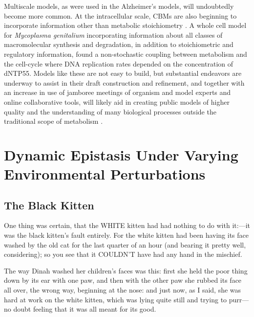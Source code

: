 \documentclass[phd,tocprelim,draft]{cornell}
\newcommand{\citep}[1]{\cite{#1}}
\begin{document}
Multiscale models, as were used in the Alzheimer’s models, will
undoubtedly become more common. At the intracellular scale, CBMs are
also beginning to incorporate information other than metabolic
stoichiometry \citep{Lerman2012, Karr2012, Yizhak2010}. 
A whole cell model for \textit{Mycoplasma genitalium}
incorporating information about all classes of macromolecular
synthesis and degradation, in addition to stoichiometric and
regulatory information, found a non-stochastic coupling between
metabolism and the cell-cycle where DNA replication rates depended on
the concentration of dNTP55. Models like these are not easy to build,
but substantial endeavors are underway to assist in their draft
construction and refinement, and together with an increase in use of
jamboree meetings of organism and model experts and online
collaborative tools, will likely aid in creating public models of
higher quality and the understanding of many biological processes
outside the traditional scope of metabolism \citep{Aziz2012,
Thiele2013, Herrgard2008, Karr2013, kbase2013, Pabinger2011,
Helikar2012}.


%

\chapter{Dynamic Epistasis Under Varying Environmental Perturbations}

\section{The Black Kitten}
  One thing was certain, that the WHITE kitten had had nothing to
do with it:---it was the black kitten's fault entirely.  For the
white kitten had been having its face washed by the old cat for
the last quarter of an hour (and bearing it pretty well,
considering); so you see that it COULDN'T have had any hand in
the mischief.

  The way Dinah washed her children's faces was this:  first she
held the poor thing down by its ear with one paw, and then with
the other paw she rubbed its face all over, the wrong way,
beginning at the nose:  and just now, as I said, she was hard at
work on the white kitten, which was lying quite still and trying
to purr---no doubt feeling that it was all meant for its good.
\end{document}
